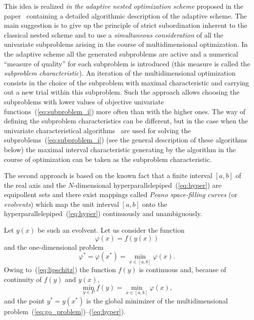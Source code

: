 \documentclass[preprint]{elsarticle}
\begin{document}
This idea is realized \emph{in the adaptive nested optimization scheme} proposed in the paper~\cite{bib38} containing a detailed algorithmic description of the adaptive scheme. The main suggestion is to give up the principle of strict subordination inherent to the classical nested scheme and to use a \emph{simultaneous consideration} of all the univariate subproblems arising in the course of multidimensional optimization. In the adaptive scheme all the generated subproblems are active and a numerical \enquote{measure of quality} for each subproblem is introduced (this measure is called the \emph{subproblem characteristic}). An iteration of the multidimensional optimization consists in the choice of the subproblem with maximal characteristic and carrying out a new trial within this subproblem. Such the approach allows choosing the subproblems with lower values of objective univariate functions~(\ref{eq:subproblem_i}) more often than with the higher ones. The way of defining the subproblem characteristics can be different, but in the case when the univariate characteristical algorithms~\cite{bib49,bib50} are used for solving the subproblems~(\ref{eq:subproblem_i}) (see the general description of these algorithms below) the maximal interval characteristic generating by the algorithm in the course of optimization can be taken as the subproblem characteristic.

The second approach is based on the known fact that a finite interval $[a, b]$ of the real axis and the $N$-dimensional hyperparallelepiped~(\ref{eq:hyper}) are equipollent sets and there exist mappings called \emph{Peano space-filling curves} (or \emph{evolvents}) which map the unit interval $[a, b]$ onto the hyperparallelepiped~(\ref{eq:hyper}) continuously and unambiguously.

Let $y(x)$ be such an evolvent. Let us consider the function
\begin{equation}
  \label{eq:peano_map}
  \varphi(x) = f(y(x))
\end{equation}
%
and the one-dimensional problem
\begin{equation}
  \label{eq:peano_min}
  \varphi^* = \varphi(x^*) = \min_{x \in [a, b]} \varphi(x).
\end{equation}
%
Owing to~(\ref{eq:lipschitz}) the function $f(y)$ is continuous and, because of continuity of $f(y)$ and $y(x)$,
\begin{equation}
  \label{eq:peano_min_2}
  \min_{y \in P} f(y) = \min_{x \in [a, b]} \varphi(x),
\end{equation}
%
and the point $y^* = y(x^*)$ is the global minimizer of the multidimensional problem~(\ref{eq:go_problem})--(\ref{eq:hyper}).
\end{document}
